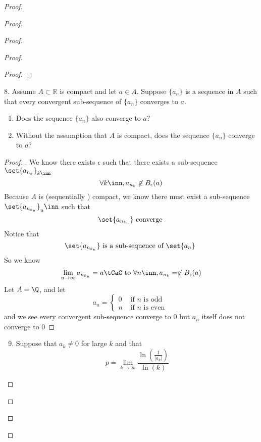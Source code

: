 \documentclass{report}
\begin{document}
\begin{proof}
\begin{proof}
\begin{proof}
\begin{proof}
\begin{proof}
\end{proof}
\begin{question}{}{}
8. Assume \( A \subset \mathbb{R} \) is compact and let \( a \in A \). Suppose \( \{ a_n \} \) is a sequence in \( A \) such that every convergent sub-sequence of \( \{ a_n \} \) converges to \( a \). 
    \begin{enumerate}
        \item Does the sequence \( \{ a_n \} \) also converge to \( a \)?
        \item Without the assumption that \( A \) is compact, does the sequence \( \{ a_n \} \) converge to \( a \)?
    \end{enumerate}
\end{question}
\begin{proof}
. We know there exists $\epsilon $ such that there exists a sub-sequence $\set{a_{n_k}}_{k\inn}$
\begin{equation}
\forall k\inn, a_{n_k}\not\in B_{\epsilon }(a)
\end{equation}
Because  $A$ is (sequentially ) compact,  we know there must exist a sub-sequence $\set{a_{n_{k_u}}}_u\inn$ such that
\begin{equation}
\set{a_{n_{k_u}}}\text{ converge }
\end{equation}
Notice that
\begin{equation}
\set{a_{n_{k_u}}}\text{ is a sub-sequence of $\set{a_n}$ }
\end{equation}
So we know 
 \begin{equation}
\lim_{u\to\infty}a_{n_{k_u}}=a\tCaC\text{ to }\forall n\inn, a_{n_{k}}=\not\in B_\epsilon (a)
\end{equation}
Let $A=\Q$, and let
 \begin{equation}
a_n=\begin{cases}
  0& \text{ if $n$ is odd }\\
  n& \text{ if $n$ is even }
\end{cases}
\end{equation}
and we see every convergent sub-sequence converge to $0$ but  $a_n$ itself does not converge to  $0$
\end{proof}
\begin{question}{}{}
\begin{enumerate}
    \setcounter{enumi}{8}
    \item Suppose that \( a_k \neq 0 \) for large \( k \) and that
    \[
    p = \lim_{{k \to \infty}} \frac{\ln\left(\frac{1}{|a_k|}\right)}{\ln(k)}
\]
\end{enumerate}
\end{question}
\end{proof}
\end{proof}
\end{proof}
\end{proof}
\end{document}
